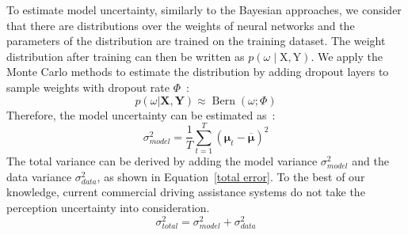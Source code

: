 To estimate model uncertainty, similarly to the Bayesian approaches, we consider that there are distributions over the weights of neural networks and the parameters of the distribution are trained on the training dataset. The weight distribution after training can then be written as $p(\omega \mid \mathrm{X}, \mathrm{Y})$. We apply the Monte Carlo methods to estimate the distribution by adding dropout layers to sample weights with dropout rate $\Phi$~\cite{gal2016dropout}:
\begin{equation}
p(\omega | \mathbf{X}, \mathbf{Y}) \approx \operatorname{Bern}(\omega ; \Phi)\label{dropout}
\end{equation}
Therefore, the model uncertainty can be estimated as~\cite{loquercio2020general}:
\begin{equation}
\sigma_{model}^{2} = \frac{1}{T} \sum_{t=1}^{T} \left(\boldsymbol{\mu}_{t}-\overline{\boldsymbol{\mu}}\right)^{2}\label{monte carlo}
\end{equation}
The total variance can be derived by adding the model variance $\sigma_{model}^{2}$ and the data variance $\sigma_{data}^{2}$, as shown in Equation~\eqref{total error}.
To the best of our knowledge, current commercial driving assistance systems do not take the perception uncertainty into consideration. 
\begin{equation}
\sigma_{total}^{2} = \sigma_{model}^{2}+\sigma_{data}^{2}\label{total error}
\end{equation}


